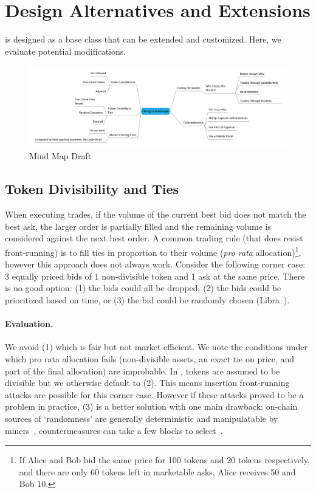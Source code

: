 
\section{Design Alternatives and Extensions}

\cm is designed as a base class that can be extended and customized. Here, we evaluate potential modifications.

\begin{figure}[t]
\centering
\includegraphics[width=1\textwidth]{fig/MindMapDraft3.png}
\caption{\footnotesize{Mind Map Draft}  \label{fig:rmindmap}}
\end{figure}

\subsection{Token Divisibility and Ties}

When executing trades, if the volume of the current best bid does not match the best ask, the larger order is partially filled and the remaining volume is considered against the next best order. A common trading rule (that does resist front-running) is to fill ties in proportion to their volume (\ie \textit{pro rata} allocation)\footnote{If Alice and Bob bid the same price for 100 tokens and 20 tokens respectively, and there are only 60 tokens left in marketable asks, Alice receives 50 and Bob 10.}, however this approach does not always work. Consider the following corner case: 3 equally priced bids of 1 non-divisible token and 1 ask at the same price. There is no good option: (1) the bids could all be dropped, (2) the bids could be prioritized based on time, or (3) the bid could be randomly chosen (\cf Libra~\cite{mavroudis2019libra}).

\paragraph{Evaluation.} We avoid (1) which is fair but not market efficient. We note the conditions under which pro rata allocation fails (\ie non-divisible assets, an exact tie on price, and part of the final allocation) are improbable. In \cm, tokens are assumed to be divisible but we otherwise default to (2). This means insertion front-running attacks are possible for this corner case. However if these attacks proved to be a problem in practice, (3) is a better solution with one main drawback: on-chain sources of `randomness' are generally deterministic and manipulatable by miners~\cite{bonneau2015random,buenz2017proofs}, countermeasures can take a few blocks to select~\cite{boneh2018verifiable}. 

